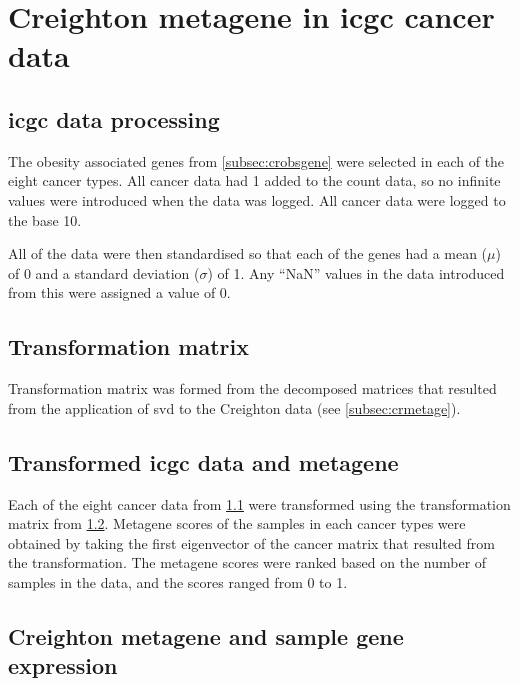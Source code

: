 \section{Creighton metagene in \gls{icgc} cancer data}
\label{sec:crmetaicgc}

\subsection{\gls{icgc} data processing}
\label{subsec:datprocicgc}

The obesity associated genes from \cref{subsec:crobsgene} were selected in each of the eight cancer types.
All cancer data had 1 added to the count data, so no infinite values were introduced when the data was logged.
All cancer data were logged to the base 10.

All of the data were then standardised so that each of the genes had a mean ($\mu$) of 0 and a standard deviation ($\sigma$) of 1.
Any ``NaN'' values in the data introduced from this were assigned a value of 0.

\subsection{Transformation matrix}
\label{subsec:transmatcr}

Transformation matrix was formed from the decomposed matrices that resulted from the application of \gls{svd} to the Creighton data (see \cref{subsec:crmetage}).

\subsection{Transformed \gls{icgc} data and metagene}
\label{subsec:icgctranscr}

Each of the eight cancer data from \cref{subsec:datprocicgc} were transformed using the transformation matrix from \cref{subsec:transmatcr}.
Metagene scores of the samples in each cancer types were obtained by taking the first eigenvector of the cancer matrix that resulted from the transformation.
The \gls{metagene} scores were ranked based on the number of samples in the data, and the scores ranged from 0 to 1.

\subsection{Creighton metagene and sample gene expression}
\label{subsec:crmetaicgcge}

